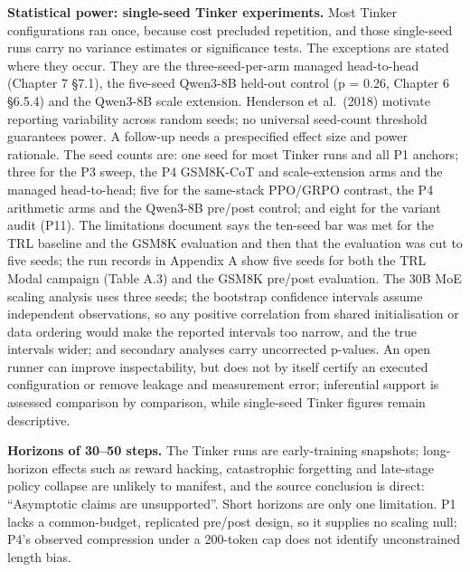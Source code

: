\documentclass[12pt,a4paper]{report}
\begin{document}
\textbf{Statistical power: single-seed Tinker experiments.} Most Tinker
configurations ran once, because cost precluded repetition, and those
single-seed runs carry no variance estimates or significance tests. The
exceptions are stated where they occur. They are the three-seed-per-arm
managed head-to-head (Chapter 7 §7.1), the five-seed Qwen3-8B held-out
control (p = 0.26, Chapter 6 §6.5.4) and the Qwen3-8B scale extension.
Henderson et al.~(2018) \citep{henderson2018deep} motivate reporting
variability across random seeds; no universal seed-count threshold
guarantees power. A follow-up needs a prespecified effect size and power
rationale. The seed counts are: one seed for most Tinker runs and all P1
anchors; three for the P3 sweep, the P4 GSM8K-CoT and scale-extension
arms and the managed head-to-head; five for the same-stack PPO/GRPO
contrast, the P4 arithmetic arms and the Qwen3-8B pre/post control; and
eight for the variant audit (P11). The limitations document says the
ten-seed bar was met for the TRL baseline and the GSM8K evaluation and
then that the evaluation was cut to five seeds; the run records in
Appendix A show five seeds for both the TRL Modal campaign (Table A.3)
and the GSM8K pre/post evaluation. The 30B MoE scaling analysis uses
three seeds; the bootstrap confidence intervals assume independent
observations, so any positive correlation from shared initialisation or
data ordering would make the reported intervals too narrow, and the true
intervals wider; and secondary analyses carry uncorrected p-values. An
open runner can improve inspectability, but does not by itself certify
an executed configuration or remove leakage and measurement error;
inferential support is assessed comparison by comparison, while
single-seed Tinker figures remain descriptive.

\textbf{Horizons of 30--50 steps.} The Tinker runs are early-training
snapshots; long-horizon effects such as reward hacking, catastrophic
forgetting and late-stage policy collapse are unlikely to manifest, and
the source conclusion is direct: ``Asymptotic claims are unsupported''.
Short horizons are only one limitation. P1 lacks a common-budget,
replicated pre/post design, so it supplies no scaling null; P4's
observed compression under a 200-token cap does not identify
unconstrained length bias.
\end{document}
